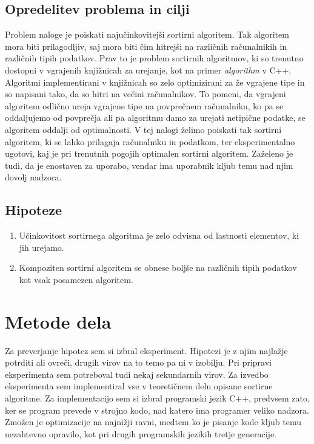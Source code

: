 \documentclass[a4paper,oneside,12pt]{article}
\begin{document}
\subsection{Opredelitev problema in cilji}
Problem naloge je poiskati najučinkovitejši sortirni algoritem. Tak algoritem
mora biti prilagodljiv, saj mora biti čim hitrejši na različnih računalnikih in
različnih tipih podatkov. Prav to je problem sortirnih algoritmov, ki so
trenutno dostopni v vgrajenih knjižnicah za urejanje, kot na primer
\emph{algorithm} v C++. Algoritmi implementirani v knjižnicah so zelo
optimizirani za že vgrajene tipe in so napisani tako, da so hitri na večini
računalnikov. To pomeni, da vgrajeni algoritem odlično ureja vgrajene tipe na
povprečnem računalniku, ko pa se oddaljujemo od povprečja ali pa algoritmu damo
za urejati netipične podatke, se algoritem oddalji od optimalnosti. V tej nalogi
želimo poiskati tak sortirni algoritem, ki se lahko prilagaja računalniku in
podatkom, ter eksperimentalno ugotovi, kaj je pri trenutnih pogojih optimalen
sortirni algoritem. Zaželeno je tudi, da je enostaven za uporabo, vendar ima uporabnik
kljub temu nad njim dovolj nadzora.

\subsection{Hipoteze}
\begin{enumerate}
  \item \label{hip:dif:type:dif:algo} Učinkovitost sortirnega
    algoritma je zelo odvisna od lastnosti elementov, ki jih urejamo.
  \item \label{hip:komp:vs:nekomp} Kompoziten sortirni algoritem se obnese boljše na različnih tipih podatkov kot vsak
    posamezen algoritem.
\end{enumerate}

\pagebreak
\mbox{}

\pagebreak

\section{Metode dela}
Za preverjanje hipotez sem si izbral eksperiment. Hipotezi je z njim najlažje
potrditi ali ovreči, drugih virov na to temo pa ni v izobilju. Pri pripravi eksperimenta
sem potreboval tudi nekaj sekundarnih virov. Za izvedbo eksperimenta sem implementiral vse 
v teoretičnem delu opisane sortirne algoritme. Za implementacijo sem si izbral programski 
jezik C++, predvsem zato, ker se program prevede v strojno kodo, nad katero ima programer
veliko nadzora. Zmožen je optimizacije na najnižji ravni, medtem ko je pisanje kode kljub
temu nezahtevno opravilo, kot pri drugih programskih jezikih tretje generacije.
\end{document}
